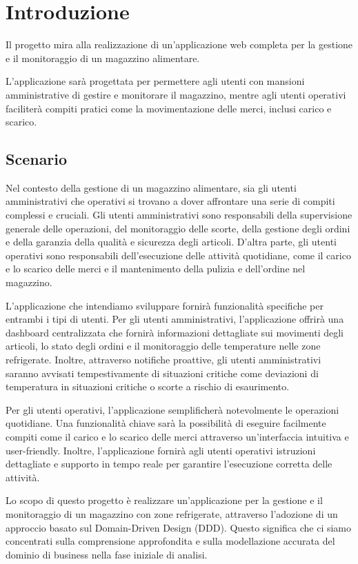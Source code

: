 \section{Introduzione}

Il progetto mira alla realizzazione di un'applicazione web completa per la gestione e il monitoraggio di un magazzino alimentare.

L'applicazione sarà progettata per permettere agli utenti con mansioni amministrative di gestire e monitorare il magazzino, mentre agli utenti operativi faciliterà compiti pratici come la movimentazione delle merci, inclusi carico e scarico.

\subsection{Scenario}

Nel contesto della gestione di un magazzino alimentare, sia gli utenti amministrativi che operativi si trovano a dover affrontare una serie di compiti complessi e cruciali. Gli utenti amministrativi sono responsabili della supervisione generale delle operazioni, del monitoraggio delle scorte, della gestione degli ordini e della garanzia della qualità e sicurezza degli articoli. D'altra parte, gli utenti operativi sono responsabili dell'esecuzione delle attività quotidiane, come il carico e lo scarico delle merci e il mantenimento della pulizia e dell'ordine nel magazzino.

L'applicazione che intendiamo sviluppare fornirà funzionalità specifiche per entrambi i tipi di utenti. Per gli utenti amministrativi, l'applicazione offrirà una dashboard centralizzata che fornirà informazioni dettagliate sui movimenti degli articoli, lo stato degli ordini e il monitoraggio delle temperature nelle zone refrigerate. Inoltre, attraverso notifiche proattive, gli utenti amministrativi saranno avvisati tempestivamente di situazioni critiche come deviazioni di temperatura in situazioni critiche o scorte a rischio di esaurimento.

Per gli utenti operativi, l'applicazione semplificherà notevolmente le operazioni quotidiane. Una funzionalità chiave sarà la possibilità di eseguire facilmente compiti come il carico e lo scarico delle merci attraverso un'interfaccia intuitiva e user-friendly. Inoltre, l'applicazione fornirà agli utenti operativi istruzioni dettagliate e supporto in tempo reale per garantire l'esecuzione corretta delle attività.

Lo scopo di questo progetto è realizzare un'applicazione per la gestione e il monitoraggio di un magazzino con zone refrigerate, attraverso l'adozione di un approccio basato sul Domain-Driven Design (DDD). Questo significa che ci siamo concentrati sulla comprensione approfondita e sulla modellazione accurata del dominio di business nella fase iniziale di analisi.

